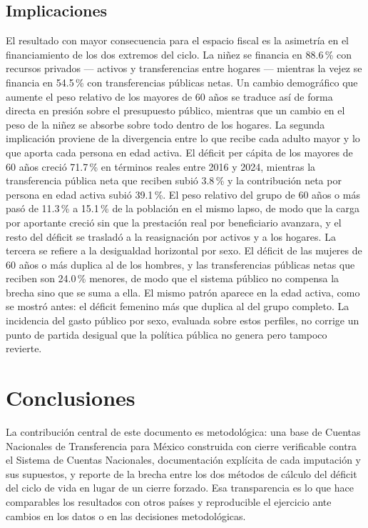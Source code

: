 \documentclass[11pt,a4paper]{article}
\begin{document}
\subsection{Implicaciones}
El resultado con mayor consecuencia para el espacio fiscal es la asimetría en el financiamiento
de los dos extremos del ciclo. La niñez se financia en 88.6\,\% con recursos privados --- activos
y transferencias entre hogares --- mientras la vejez se financia en 54.5\,\% con transferencias
públicas netas. Un cambio demográfico que aumente el peso relativo de los mayores de 60 años se
traduce así de forma directa en presión sobre el presupuesto público, mientras que un cambio en
el peso de la niñez se absorbe sobre todo dentro de los hogares.
La segunda implicación proviene de la divergencia entre lo que recibe cada adulto mayor y lo que
aporta cada persona en edad activa. El déficit per cápita de los mayores de 60 años creció
71.7\,\% en términos reales entre 2016 y 2024, mientras la transferencia pública neta que reciben
subió 3.8\,\% y la contribución neta por persona en edad activa subió 39.1\,\%. El peso relativo
del grupo de 60 años o más pasó de 11.3\,\% a 15.1\,\% de la población en el mismo lapso, de modo
que la carga por aportante creció sin que la prestación real por beneficiario avanzara, y el resto
del déficit se trasladó a la reasignación por activos y a los hogares.
La tercera se refiere a la desigualdad horizontal por sexo. El déficit de las mujeres de 60 años
o más duplica al de los hombres, y las transferencias públicas netas que reciben son 24.0\,\%
menores, de modo que el sistema público no compensa la brecha sino que se suma a ella. El mismo
patrón aparece en la edad activa, como se mostró antes: el déficit femenino más que duplica al
del grupo completo. La incidencia del gasto público por sexo, evaluada sobre estos perfiles, no
corrige un punto de partida desigual que la política pública no genera pero tampoco revierte.
\section{Conclusiones}
\label{sec:conclusiones}

La contribución central de este documento es metodológica: una base de Cuentas
Nacionales de Transferencia para México construida con cierre verificable contra el
Sistema de Cuentas Nacionales, documentación explícita de cada imputación y sus
supuestos, y reporte de la brecha entre los dos métodos de cálculo del déficit del
ciclo de vida en lugar de un cierre forzado. Esa transparencia es lo que hace
comparables los resultados con otros países y reproducible el ejercicio ante cambios
en los datos o en las decisiones metodológicas.
\end{document}
